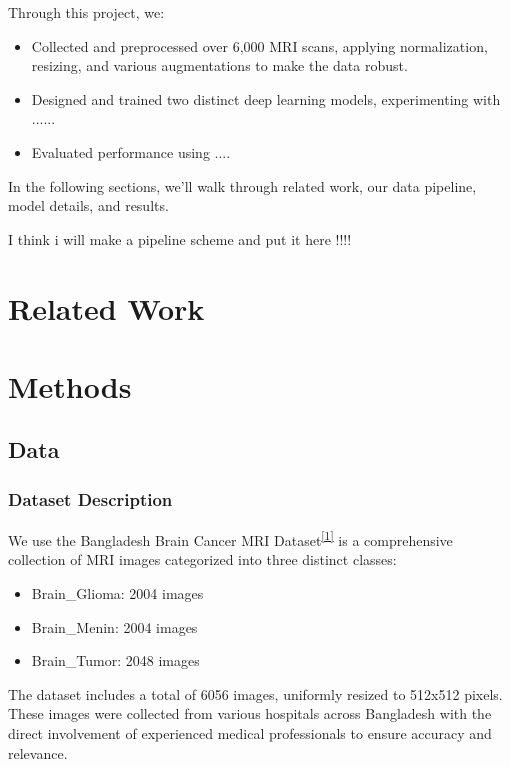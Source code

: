 \documentclass[twocolumn,superscriptaddress,aps]{revtex4-1}
\begin{document}
Through this project, we:

\begin{itemize}
        \item Collected and preprocessed over 6,000 MRI scans, applying normalization, resizing, and various augmentations to make the data robust.
        \item Designed and trained two distinct deep learning models, experimenting with ......
        \item Evaluated performance using ....
    \end{itemize}
    
In the following sections, we’ll walk through related work, our data pipeline, model details, and results.


I think i will make a pipeline scheme and put it here !!!!

\section{Related Work}


\section{Methods}
\subsection{Data}
\subsubsection{Dataset Description}
We use the Bangladesh Brain Cancer MRI Dataset\textsuperscript{\hyperlink{ref1}{[1]}} is a comprehensive collection of MRI images categorized into three distinct classes:
\begin{itemize}
    \item Brain\_Glioma: 2004 images
    \item Brain\_Menin: 2004 images
    \item Brain\_Tumor: 2048 images
    \end{itemize}
The dataset includes a total of 6056 images, uniformly resized to 512x512 pixels. These images were collected from various hospitals across Bangladesh with the direct involvement of experienced medical professionals to ensure accuracy and relevance.
\end{document}
